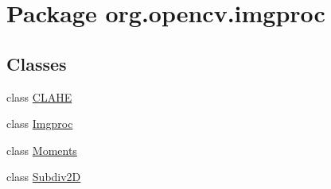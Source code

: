 \hypertarget{namespaceorg_1_1opencv_1_1imgproc}{}\section{Package org.\+opencv.\+imgproc}
\label{namespaceorg_1_1opencv_1_1imgproc}
\subsection*{Classes}
\begin{DoxyCompactItemize}
\item 
class \mbox{\hyperlink{classorg_1_1opencv_1_1imgproc_1_1_c_l_a_h_e}{C\+L\+A\+HE}}
\item 
class \mbox{\hyperlink{classorg_1_1opencv_1_1imgproc_1_1_imgproc}{Imgproc}}
\item 
class \mbox{\hyperlink{classorg_1_1opencv_1_1imgproc_1_1_moments}{Moments}}
\item 
class \mbox{\hyperlink{classorg_1_1opencv_1_1imgproc_1_1_subdiv2_d}{Subdiv2D}}
\end{DoxyCompactItemize}
